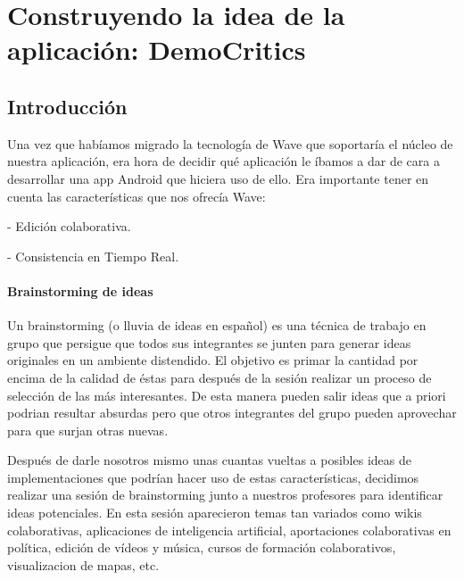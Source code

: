 \newpage
\thispagestyle{sectioned}
\chapter{Construyendo la idea de la aplicación: DemoCritics}

\section{Introducción}

Una vez que habíamos migrado la tecnología de Wave que soportaría el núcleo de nuestra aplicación, era hora de decidir qué aplicación le íbamos a dar de cara a desarrollar una app Android que hiciera uso de ello. Era importante tener en cuenta las características que nos ofrecía Wave:

 - Edición colaborativa.

 - Consistencia en Tiempo Real.
 
\subsubsection{Brainstorming de ideas}

Un brainstorming (o lluvia de ideas en español) es una técnica de trabajo en grupo que persigue que todos sus integrantes se junten para generar ideas originales en un ambiente distendido. El objetivo es primar la cantidad por encima de la calidad de éstas para después de la sesión realizar un proceso de selección de las más interesantes. De esta manera pueden salir ideas que a priori podrian resultar absurdas pero que otros integrantes del grupo pueden aprovechar para que surjan otras nuevas.  

Después de darle nosotros mismo unas cuantas vueltas a posibles ideas de implementaciones que podrían hacer uso de estas características, decidimos realizar una sesión de brainstorming junto a nuestros profesores para identificar ideas potenciales. En esta sesión aparecieron temas tan variados como wikis colaborativas, aplicaciones de inteligencia artificial, aportaciones colaborativas en política, edición de vídeos y música, cursos de formación colaborativos, visualizacion de mapas, etc.

